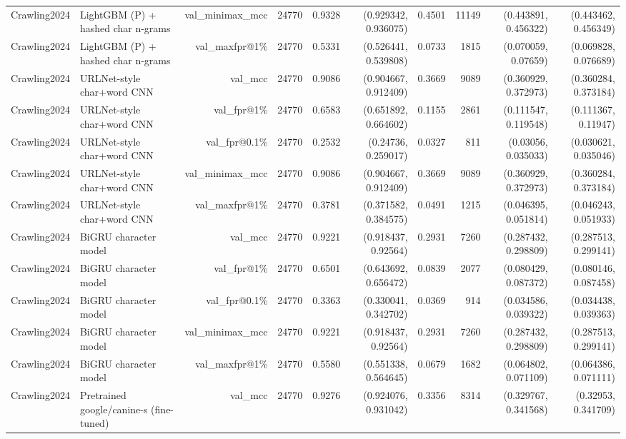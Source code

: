 \begin{table}[t]
\begin{tabular}{llrrrrrrrr}
Crawling2024 & LightGBM (P) + hashed char n-grams & val\_minimax\_mcc & 24770 & 0.9328 & (0.929342, 0.936075) & 0.4501 & 11149 & (0.443891, 0.456322) & (0.443462, 0.456349) \\
Crawling2024 & LightGBM (P) + hashed char n-grams & val\_maxfpr@1\% & 24770 & 0.5331 & (0.526441, 0.539808) & 0.0733 & 1815 & (0.070059, 0.07659) & (0.069828, 0.076689) \\
Crawling2024 & URLNet-style char+word CNN & val\_mcc & 24770 & 0.9086 & (0.904667, 0.912409) & 0.3669 & 9089 & (0.360929, 0.372973) & (0.360284, 0.373184) \\
Crawling2024 & URLNet-style char+word CNN & val\_fpr@1\% & 24770 & 0.6583 & (0.651892, 0.664602) & 0.1155 & 2861 & (0.111547, 0.119548) & (0.111367, 0.11947) \\
Crawling2024 & URLNet-style char+word CNN & val\_fpr@0.1\% & 24770 & 0.2532 & (0.24736, 0.259017) & 0.0327 & 811 & (0.03056, 0.035033) & (0.030621, 0.035046) \\
Crawling2024 & URLNet-style char+word CNN & val\_minimax\_mcc & 24770 & 0.9086 & (0.904667, 0.912409) & 0.3669 & 9089 & (0.360929, 0.372973) & (0.360284, 0.373184) \\
Crawling2024 & URLNet-style char+word CNN & val\_maxfpr@1\% & 24770 & 0.3781 & (0.371582, 0.384575) & 0.0491 & 1215 & (0.046395, 0.051814) & (0.046243, 0.051933) \\
Crawling2024 & BiGRU character model & val\_mcc & 24770 & 0.9221 & (0.918437, 0.92564) & 0.2931 & 7260 & (0.287432, 0.298809) & (0.287513, 0.299141) \\
Crawling2024 & BiGRU character model & val\_fpr@1\% & 24770 & 0.6501 & (0.643692, 0.656472) & 0.0839 & 2077 & (0.080429, 0.087372) & (0.080146, 0.087458) \\
Crawling2024 & BiGRU character model & val\_fpr@0.1\% & 24770 & 0.3363 & (0.330041, 0.342702) & 0.0369 & 914 & (0.034586, 0.039322) & (0.034438, 0.039363) \\
Crawling2024 & BiGRU character model & val\_minimax\_mcc & 24770 & 0.9221 & (0.918437, 0.92564) & 0.2931 & 7260 & (0.287432, 0.298809) & (0.287513, 0.299141) \\
Crawling2024 & BiGRU character model & val\_maxfpr@1\% & 24770 & 0.5580 & (0.551338, 0.564645) & 0.0679 & 1682 & (0.064802, 0.071109) & (0.064386, 0.071111) \\
Crawling2024 & Pretrained google/canine-s (fine-tuned) & val\_mcc & 24770 & 0.9276 & (0.924076, 0.931042) & 0.3356 & 8314 & (0.329767, 0.341568) & (0.32953, 0.341709) \\

\end{tabular}
\end{table}

